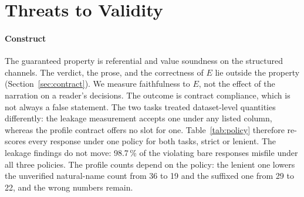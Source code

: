 \documentclass[journal]{IEEEtran}
\begin{document}
\section{Threats to Validity}\label{sec:threats}

\paragraph{Construct}
The guaranteed property is referential and value soundness on the structured
channels. The verdict, the prose, and the correctness of $E$ lie outside the
property (Section~\ref{sec:contract}). We measure faithfulness to $E$, not the
effect of the narration on a reader's decisions. The outcome is contract
compliance, which is not always a false statement. The two tasks treated
dataset-level quantities differently: the leakage measurement accepts one
under any listed column, whereas the profile contract offers no slot for one.
Table~\ref{tab:policy} therefore re-scores every response under one policy
for both tasks, strict or lenient. The leakage findings do not move: 98.7\,\%
of the violating bare responses misfile under all three policies. The profile
counts depend on the policy: the lenient one lowers the unverified natural-name
count from 36 to 19 and the suffixed one from 29 to 22, and the wrong numbers
remain.
\end{document}
